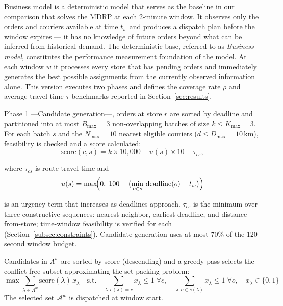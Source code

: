 \documentclass[runningheads]{llncs}
\begin{document}
Business model  is a deterministic model that serves as the
baseline in our comparison that solves the MDRP at each 2-minute window. It observes only the orders and couriers available at time $t_w$ and produces a dispatch plan before the window expires — it has no knowledge of future orders beyond what can be inferred from historical demand. The deterministic base, referred to as \emph{Business model}, constitutes the performance measurement foundation of the model. At each window $w$ it processes every store that has pending orders and immediately generates the best possible assignments from the currently observed information alone. This version executes two phases and defines the coverage rate $\rho$ and average travel time $\bar{\tau}$ benchmarks reported in Section~\ref{sec:results}.

Phase 1 —Candidate generation—, orders at store $r$ are sorted by deadline and partitioned into at most $B_{\max}=3$ non-overlapping batches of size $k \leq K_{\max}=3$. For each batch $s$ and the $N_{\max}=10$ nearest eligible couriers ($d \leq D_{\max}=10$\,km), feasibility is checked and a score calculated:
\vspace{-6pt}
\begin{equation}\label{eq:maxcover_score}
    \text{score}(c, s) = k \times 10{,}000 + u(s) \times 10 - \tau_{cs},
\end{equation}

where $\tau_{cs}$ is route travel time and
\vspace{-6pt}
\begin{equation}\label{eq:urgency}
    u(s) = \max\!\Bigl(0,\;100 - \bigl(\min_{o \in s}\,\text{deadline}(o) - t_w\bigr)\Bigr)
\end{equation}

is an urgency term that increases as deadlines approach. $\tau_{cs}$ is the minimum over three constructive sequences: nearest neighbor, earliest deadline, and distance-from-store; time-window feasibility is verified for each (Section~\ref{subsec:constraints}).
Candidate generation uses at most 70\% of the 120-second window budget.

Candidates in $\Lambda^w$ are sorted by score (descending) and a greedy pass selects the conflict-free subset approximating the set-packing problem:
\vspace{-6pt}
{\small
\begin{equation}\label{eq:set_packing}
    \max \sum_{\lambda \in \Lambda^w} \text{score}(\lambda)\,x_\lambda
    \quad\text{s.t.}\quad
    \sum_{\lambda: c(\lambda)=c} x_\lambda \leq 1\;\forall c,\quad
    \sum_{\lambda: o \in s(\lambda)} x_\lambda \leq 1\;\forall o,\quad
    x_\lambda \in \{0,1\}
\end{equation}
}
The selected set $\mathcal{A}^w$ is dispatched at window start.
\end{document}
